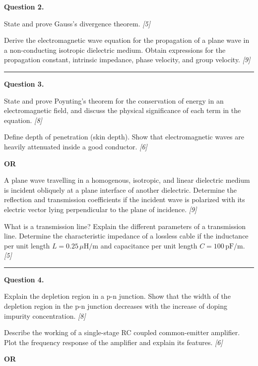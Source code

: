 \documentclass[11pt,a4paper]{article}
\newcommand{\pts}[1]{\hfill   \textit{[#1]}}
\begin{document}
\noindent   \textbf{Question 2.}

\begin{parts}
  \item State and prove Gauss's divergence theorem. \pts{5}
  \item Derive the electromagnetic wave equation for the propagation of a plane wave in a non-conducting isotropic dielectric medium. Obtain expressions for the propagation constant, intrinsic impedance, phase velocity, and group velocity. \pts{9}
\end{parts}

\medskip\rule{\linewidth}{0.2pt}




\noindent   \textbf{Question 3.}

\begin{parts}
  \item State and prove Poynting's theorem for the conservation of energy in an electromagnetic field, and discuss the physical significance of each term in the equation. \pts{8}
  \item Define depth of penetration (skin depth). Show that electromagnetic waves are heavily attenuated inside a good conductor. \pts{6}
\end{parts}
\hfill   \textbf{OR}

\begin{parts}
  \item A plane wave travelling in a homogenous, isotropic, and linear dielectric medium is incident obliquely at a plane interface of another dielectric. Determine the reflection and transmission coefficients if the incident wave is polarized with its electric vector lying perpendicular to the plane of incidence. \pts{9}
  \item What is a transmission line? Explain the different parameters of a transmission line. Determine the characteristic impedance of a lossless cable if the inductance per unit length $L = 0.25\,\mu \text{H/m}$ and capacitance per unit length $C = 100\, \text{pF/m}$. \pts{5}
\end{parts}

\medskip\rule{\linewidth}{0.2pt}




\noindent   \textbf{Question 4.}

\begin{parts}
  \item Explain the depletion region in a p-n junction. Show that the width of the depletion region in the p-n junction decreases with the increase of doping impurity concentration. \pts{8}
  \item Describe the working of a single-stage RC coupled common-emitter amplifier. Plot the frequency response of the amplifier and explain its features. \pts{6}
\end{parts}
\hfill   \textbf{OR}
\end{document}
